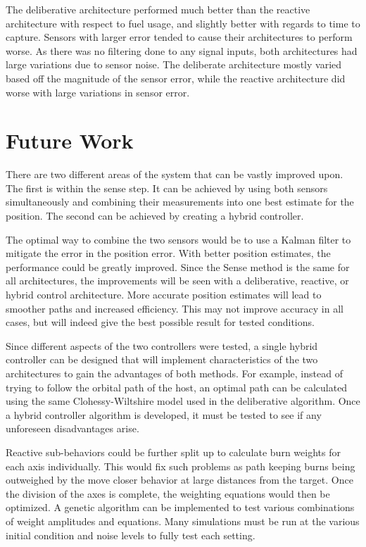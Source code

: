 \documentclass[journal, 10pt]{IEEEtran}
\begin{document}
The deliberative architecture performed much better than the reactive architecture with respect to fuel usage, and slightly better with regards to time to capture. Sensors with larger error tended to cause their architectures to perform worse. As there was no filtering done to any signal inputs, both architectures had large variations due to sensor noise. The deliberate architecture mostly varied based off the magnitude of the sensor error, while the reactive architecture did worse with large variations in sensor error.

\section{Future Work}
There are two different areas of the system that can be vastly improved upon.  The first is within the sense step.  It can be achieved by using both sensors simultaneously and combining their measurements into one best estimate for the position.  The second can be achieved by creating a hybrid controller.

The optimal way to combine the two sensors would be to use a Kalman filter to mitigate the error in the position error.  With better position estimates, the performance could be greatly improved.  Since the Sense method is the same for all architectures, the improvements will be seen with a deliberative, reactive, or hybrid control architecture.  More accurate position estimates will lead to smoother paths and increased efficiency. This may not improve accuracy in all cases, but will indeed give the best possible result for tested conditions.

Since different aspects of the two controllers were tested, a single hybrid controller can be designed that will implement characteristics of the two architectures to gain the advantages of both methods.  For example, instead of trying to follow the orbital path of the host, an optimal path can be calculated using the same Clohessy-Wiltshire model used in the deliberative algorithm.  Once a hybrid controller algorithm is developed, it must be tested to see if any unforeseen disadvantages arise.

Reactive sub-behaviors could be further split up to calculate burn weights for each axis individually.  This would fix such problems as path keeping burns being outweighed by the move closer behavior at large distances from the target.  Once the division of the axes is complete, the weighting equations would then be optimized.  A genetic algorithm can be implemented to test various combinations of weight amplitudes and equations.  Many simulations must be run at the various initial condition and noise levels to fully test each setting.
\end{document}
